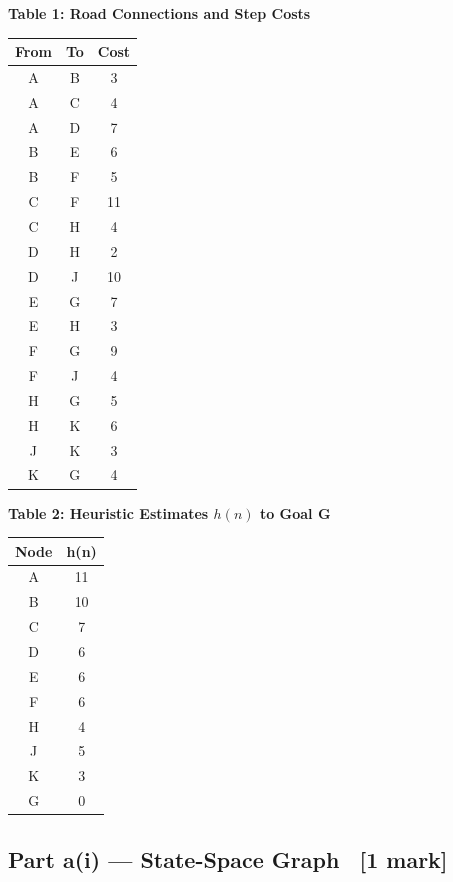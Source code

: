 \documentclass[12pt, a4paper]{article}
\begin{document}
\vspace{0.6em}
\begin{minipage}[t]{0.46\textwidth}
\centering
{\small\textbf{Table 1: Road Connections and Step Costs}}\\[0.4em]
\begin{tabular}{ccc}
\toprule
\textbf{From} & \textbf{To} & \textbf{Cost} \\
\midrule
A & B & 3 \\
A & C & 4 \\
A & D & 7 \\
B & E & 6 \\
B & F & 5 \\
C & F & 11 \\
C & H & 4 \\
D & H & 2 \\
D & J & 10 \\
E & G & 7 \\
E & H & 3 \\
F & G & 9 \\
F & J & 4 \\
H & G & 5 \\
H & K & 6 \\
J & K & 3 \\
K & G & 4 \\
\bottomrule
\end{tabular}
\end{minipage}
\hfill
\begin{minipage}[t]{0.46\textwidth}
\centering
{\small\textbf{Table 2: Heuristic Estimates $h(n)$ to Goal G}}\\[0.4em]
\begin{tabular}{cc}
\toprule
\textbf{Node} & \textbf{h(n)} \\
\midrule
A & 11 \\
B & 10 \\
C & 7  \\
D & 6  \\
E & 6  \\
F & 6  \\
H & 4  \\
J & 5  \\
K & 3  \\
G & 0  \\
\bottomrule
\end{tabular}
\end{minipage}

\subsection{Part a(i) — State-Space Graph \ [1 mark]}
\end{document}
